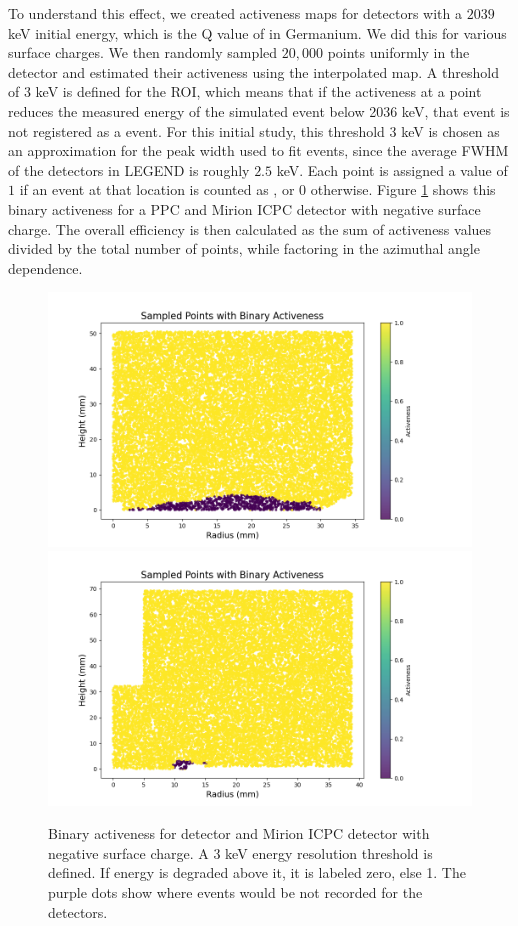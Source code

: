 To understand this effect, we created activeness maps for detectors with a $2039$ keV initial energy, which is the Q value of {\onbb} in Germanium. We did this for various surface charges. We then randomly sampled $20,000$ points uniformly in the detector and estimated their activeness using the interpolated map. A threshold of $3$ keV is defined for the ROI, which means that if the activeness at a point reduces the measured energy of the simulated {\onbb} event below 2036 keV, that event is not registered as a {\onbb} event. For this initial study, this threshold $3$ keV is chosen as an approximation for the peak width used to fit {\onbb} events, since the average FWHM of the detectors in LEGEND is roughly $2.5$ keV.  Each point is assigned a value of $1$ if an event at that location is counted as {\onbb}, or $0$ otherwise. Figure \ref{ch5_fig_binary_activenss} shows this binary activeness for a PPC and Mirion ICPC detector with negative surface charge. The overall efficiency is then calculated as the sum of activeness values divided by the total number of points, while factoring in the azimuthal angle dependence.



\begin{figure}%
\centering
\includegraphics[trim={1.5cm 0cm 6cm 1.77cm},clip,width=0.49\linewidth]{ch5/figs/bianry_act_ponama_1_-0.03.png}
\includegraphics[trim={1.5cm 0cm 6cm 1.77cm},clip,width=0.49\linewidth]{ch5/figs/bianry_act_V07647A_-0.03.png}
\caption{Binary activeness for {\ponama} detector and Mirion ICPC detector with negative surface charge. A $3$ keV energy resolution threshold is defined. If energy is degraded above it, it is labeled zero, else 1. The purple dots show where {\onbb} events would be not recorded for the detectors.}
\label{ch5_fig_binary_activenss}
\end{figure}

